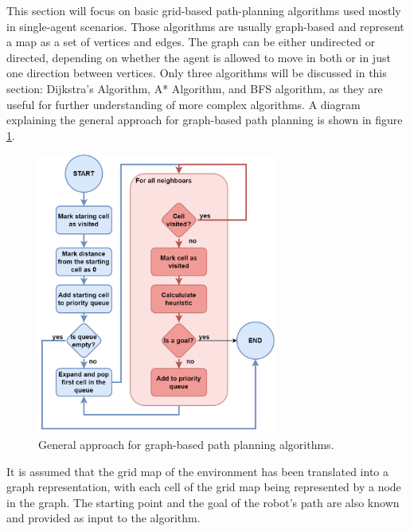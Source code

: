 
%
%
This section will focus on basic grid-based path-planning algorithms used mostly in single-agent scenarios. Those algorithms are usually graph-based and represent a map as a set of vertices and edges. The graph can be either undirected or directed, depending on whether the agent is allowed to move in both or in just one direction between vertices\cite{basic_algorithms}. Only three algorithms will be discussed in this section: Dijkstra's Algorithm, A* Algorithm, and BFS algorithm, as they are useful for further understanding of more complex algorithms. A diagram explaining the general approach for graph-based path planning is shown in figure \ref{fig:simple_path_planning}. 

\begin{figure}[H]
    \centering
    \includegraphics[width=0.7\textwidth]{pictures/simple_algos.png}
    \caption{General approach for graph-based path planning algorithms. }
    \label{fig:simple_path_planning}
\end{figure}

It is assumed that the grid map of the environment has been translated into a graph representation, with each cell of the grid map being represented by a node in the graph. The starting point and the goal of the robot's path are also known and provided as input to the algorithm.

